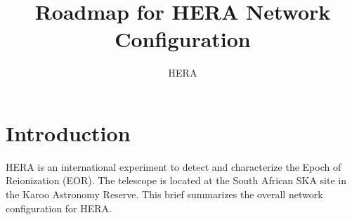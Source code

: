 \documentclass{article}
\begin{document}
\author{HERA}
\title{Roadmap for HERA Network Configuration}
\maketitle

\section{Introduction}
HERA is an international experiment to detect and characterize the Epoch of Reionization (EOR).  The telescope is located at the South African SKA site in the Karoo
Astronomy Reserve.  This brief summarizes the overall network configuration for HERA.

\end{document}
